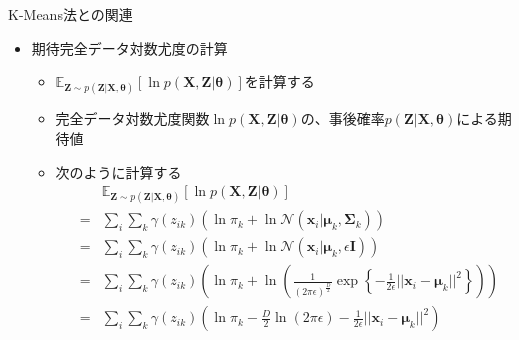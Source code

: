 \documentclass[dvipdfmx,notheorems,t]{beamer}
\begin{document}
\begin{frame}{K-Means法との関連}
\begin{itemize}
\begin{itemize}
		\item これは、$k^*$番目のクラスタに\alert{確率$1$で属する}ということ、即ち、クラスタ$k^*$への\alert{ハード割り当て}を意味する
		\newline
		\item $k^* = \argmin_j || \bm{x} - \bm{\mu}_j ||^2$であるから、結局、各データ点は、\color{red}平均ベクトル$\bm{\mu}$への二乗ユークリッド距離が最小となるクラスタ\normalcolor に割り当てることになる
		\newline
		\item $\gamma(z_{ik})$を$r_{ik}$に置き換えれば、EMアルゴリズムにおける$\bm{\mu}_k$の更新式は、K-Meansにおける平均ベクトルの更新式に帰着
		\begin{eqnarray}
			\text{K-Means}: && \bm{\mu}_k = \frac{1}{\sum_i \color{red}r_{ik}\normalcolor} \sum_i \color{red}r_{ik}\normalcolor \bm{x}_i \\
			\text{EMアルゴリズム}: && \bm{\mu}_k = \frac{1}{\sum_i \color{red}\gamma(z_{ik})\normalcolor} \sum_i \color{red}\gamma(z_{ik})\normalcolor \bm{x}_i
		\end{eqnarray}
		
		\item 従って、混合ガウスモデルのEMアルゴリズムにおいて、各ガウス分布の共分散行列を$\epsilon \bm{I}$としたとき、\color{red}$\epsilon \to 0$の極限を取ると、K-Means法が得られる\normalcolor
	\end{itemize}
	
	\framebreak
	
	\item 期待完全データ対数尤度の計算
	\begin{itemize}
		\item $\mathbb{E}_{\bm{Z} \sim p(\bm{Z} | \bm{X}, \bm{\theta})} \left[ \ln p(\bm{X}, \bm{Z} | \bm{\theta}) \right]$を計算する
		\item 完全データ対数尤度関数$\ln p(\bm{X}, \bm{Z} | \bm{\theta})$の、事後確率$p(\bm{Z} | \bm{X}, \bm{\theta})$による期待値
		\newline
		\item 次のように計算する
		\begin{eqnarray}
			&& \mathbb{E}_{\bm{Z} \sim p(\bm{Z} | \bm{X}, \bm{\theta})} \left[ \ln p(\bm{X}, \bm{Z} | \bm{\theta}) \right] \nonumber \\
			&=& \sum_i \sum_k \gamma(z_{ik}) \left( \ln \pi_k + \ln \mathcal{N}(\bm{x}_i | \bm{\mu}_k, \bm{\Sigma}_k) \right) \nonumber \\
			&=& \sum_i \sum_k \gamma(z_{ik}) \left( \ln \pi_k + \ln \mathcal{N}(\bm{x}_i | \bm{\mu}_k, \epsilon \bm{I}) \right) \nonumber \\
			&=& \sum_i \sum_k \gamma(z_{ik}) \left( \ln \pi_k + \ln \left( \frac{1}{(2\pi \epsilon)^\frac{D}{2}} \exp \left\{ -\frac{1}{2\epsilon} || \bm{x}_i - \bm{\mu}_k ||^2 \right\} \right) \right) \nonumber \\
			&=& \sum_i \sum_k \gamma(z_{ik}) \left( \ln \pi_k - \frac{D}{2} \ln (2\pi \epsilon) - \frac{1}{2\epsilon} || \bm{x}_i - \bm{\mu}_k ||^2 \right)
		\end{eqnarray}
		

\end{itemize}
\end{itemize}
\end{frame}
\end{document}
